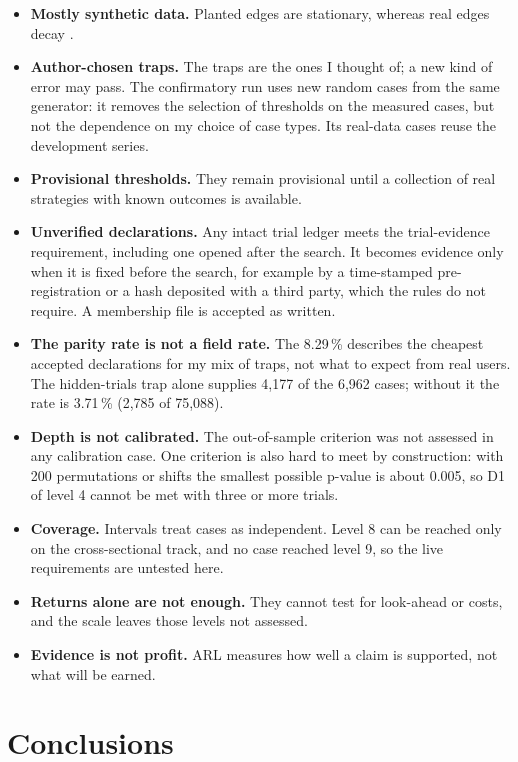 \documentclass[11pt]{article}
\begin{document}
\begin{itemize}
\item \textbf{Mostly synthetic data.} Planted edges are stationary, whereas real edges decay \citep{mclean2016}.
\item \textbf{Author-chosen traps.} The traps are the ones I thought of; a new kind of error may pass. The confirmatory
run uses new random cases from the same generator: it removes the selection of thresholds on the measured cases, but not
the dependence on my choice of case types. Its real-data cases reuse the development series.
\item \textbf{Provisional thresholds.} They remain provisional until a collection of real strategies with known outcomes
is available.
\item \textbf{Unverified declarations.} Any intact trial ledger meets the trial-evidence requirement, including one
opened after the search. It becomes evidence only when it is fixed before the search, for example by a time-stamped
pre-registration or a hash deposited with a third party, which the rules do not require. A membership file is accepted
as written.
\item \textbf{The parity rate is not a field rate.} The 8.29\,\% describes the cheapest accepted declarations for my mix
of traps, not what to expect from real users. The hidden-trials trap alone supplies 4,177 of the 6,962 cases; without it
the rate is 3.71\,\% (2,785 of 75,088).
\item \textbf{Depth is not calibrated.} The out-of-sample criterion was not assessed in any calibration case. One
criterion is also hard to meet by construction: with 200 permutations or shifts the smallest possible p-value is about
0.005, so D1 of level 4 cannot be met with three or more trials.
\item \textbf{Coverage.} Intervals treat cases as independent. Level 8 can be reached only on the cross-sectional track,
and no case reached level 9, so the live requirements are untested here.
\item \textbf{Returns alone are not enough.} They cannot test for look-ahead or costs, and the scale leaves those levels
not assessed.
\item \textbf{Evidence is not profit.} ARL measures how well a claim is supported, not what will be earned.
\end{itemize}

\section{Conclusions}
\end{document}
